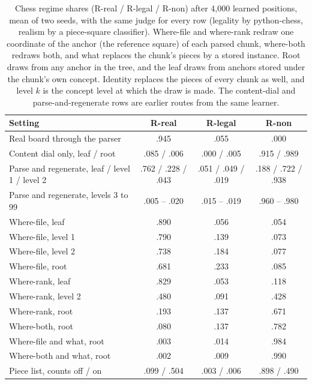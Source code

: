 \documentclass[11pt,letterpaper]{article}
\begin{document}
\begin{table}[h]
\caption{Chess regime shares (R-real / R-legal / R-non) after 4,000 learned positions, mean of two seeds, with the same judge for every row (legality by python-chess, realism by a piece-square classifier).
Where-file and where-rank redraw one coordinate of the anchor (the reference square) of each parsed chunk, where-both redraws both, and what replaces the chunk's pieces by a stored instance. Root draws from any anchor in the tree, and the leaf draws from anchors stored under the chunk's own concept.
Identity replaces the pieces of every chunk as well, and level $k$ is the concept level at which the draw is made. The content-dial and parse-and-regenerate rows are earlier routes from the same learner.}
\label{tab:chesslaw}
\begin{center}
\footnotesize
\begin{tabular}{lccc}
\toprule
Setting & R-real & R-legal & R-non \\
\midrule
Real board through the parser & .945 & .055 & .000 \\
Content dial only, leaf / root & .085 / .006 & .000 / .005 & .915 / .989 \\
Parse and regenerate, leaf / level 1 / level 2 & .762 / .228 / .043 & .051 / .049 / .019 & .188 / .722 / .938 \\
Parse and regenerate, levels 3 to 99 & .005 -- .020 & .015 -- .019 & .960 -- .980 \\
Where-file, leaf & .890 & .056 & .054 \\
Where-file, level 1 & .790 & .139 & .073 \\
Where-file, level 2 & .738 & .184 & .077 \\
Where-file, root & .681 & .233 & .085 \\
Where-rank, leaf & .829 & .053 & .118 \\
Where-rank, level 2 & .480 & .091 & .428 \\
Where-rank, root & .193 & .137 & .671 \\
Where-both, root & .080 & .137 & .782 \\
Where-file and what, root & .003 & .014 & .984 \\
Where-both and what, root & .002 & .009 & .990 \\
Piece list, counts off / on & .099 / .504 & .003 / .006 & .898 / .490 \\
\bottomrule
\end{tabular}
\end{center}
\end{table}
\end{document}
